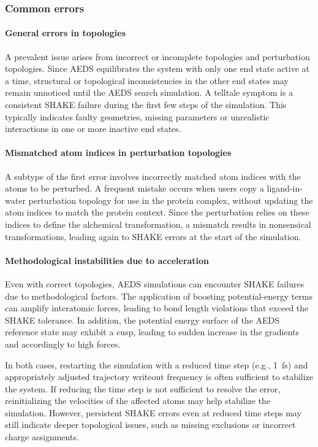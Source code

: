 \subsubsection{Common errors}

\paragraph{General errors in topologies}  
A prevalent issue arises from incorrect or incomplete topologies and perturbation topologies. Since AEDS equilibrates the system with only one end state active at a time, structural or topological inconsistencies in the other end states may remain unnoticed until the AEDS search simulation. A telltale symptom is a consistent SHAKE failure during the first few steps of the simulation. This typically indicates faulty geometries, missing parameters or unrealistic interactions in one or more inactive end states.

\paragraph{Mismatched atom indices in perturbation topologies}  
A subtype of the first error involves incorrectly matched atom indices with the atoms to be perturbed. A frequent mistake occurs when users copy a ligand-in-water perturbation topology for use in the protein complex, without updating the atom indices to match the protein context. Since the perturbation relies on these indices to define the alchemical transformation, a mismatch results in nonsensical transformations, leading again to SHAKE errors at the start of the simulation.

\paragraph{Methodological instabilities due to acceleration}  
Even with correct topologies, AEDS simulations can encounter SHAKE failures due to methodological factors. The application of boosting potential-energy terms can amplify interatomic forces, leading to bond length violations that exceed the SHAKE tolerance. In addition, the potential energy surface of the AEDS reference state may exhibit a cusp, leading to sudden increase in the gradients and accordingly to high forces. 

In both cases, restarting the simulation with a reduced time step (e.g., 1~fs) and appropriately adjusted trajectory writeout frequency is often sufficient to stabilize the system. If reducing the time step is not sufficient to resolve the error, reinitializing the velocities of the affected atoms may help stabilize the simulation. However, persistent SHAKE errors even at reduced time steps may still indicate deeper topological issues, such as missing exclusions or incorrect charge assignments.

